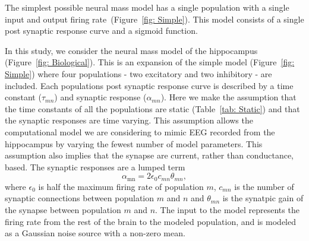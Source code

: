 The simplest possible neural mass model has a single population with a single input and output firing rate~(Figure~\ref{fig: Simple}). This model consists of a single post synaptic response curve and a sigmoid function.

In this study, we consider the neural mass model of the hippocampus (Figure~\ref{fig: Biological}). This is an expansion of the simple model (Figure~\ref{fig: Simple}) where four populations - two excitatory and two inhibitory - are included. Each populations post synaptic response curve is described by a time constant ($\tau_{mn}$) and synaptic response ($\alpha_{mn}$). Here we make the assumption that the time constants of all the populations are static (Table~\ref{tab: Static}) and that the synaptic responses are time varying. This assumption allows the computational model we are considering to mimic EEG recorded from the hippocampus by varying the fewest number of model parameters. This assumption also implies that the synapse are current, rather than conductance, based. The synaptic responses are a lumped term
\begin{equation}\label{eq: Synaptoic response}
    \alpha_{\mathrm{mn}} = 2\epsilon_{0}c_{mn}\theta_{mn},
\end{equation} where $\epsilon_0$ is half the maximum firing rate of population $m$, $c_{mn}$ is the number of synaptic connections between population $m$ and $n$ and $\theta_{mn}$ is the synatpic gain of the synapse between population $m$ and $n$. The input to the model represents the firing rate from the rest of the brain to the modeled population, and is modeled as a Gaussian noise source with a non-zero mean.

